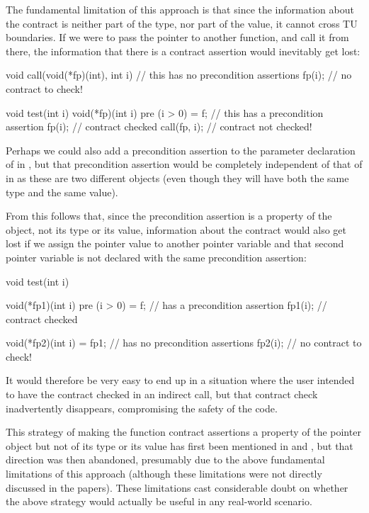 The fundamental limitation of this approach is that since the information about the contract is neither part of the type, nor part of the value, it cannot cross TU boundaries. If we were to pass the pointer  to another function, and call it from there, the information that there is a contract assertion would inevitably get lost:
\begin{codeblock}
void call(void(*fp)(int), int i) {    // this  has no precondition assertions
  fp(i);       // no contract to check!
}

void test(int i) {
  void(*fp)(int i) pre (i > 0) = f;   // this  has a precondition assertion
  fp(i);       // contract  checked
  call(fp, i); // contract  not checked!
}
\end{codeblock}
Perhaps we could also add a precondition assertion to the parameter declaration of  in , but that precondition assertion would be completely independent of that of  in  as these are two different objects (even though they will have both the same type and the same value).

From this follows that, since the precondition assertion is a property of the object, not its type or its value, information about the contract would also get lost if we assign the pointer value to another pointer variable and that second pointer variable is not declared with the same precondition assertion:
\begin{codeblock}
void test(int i) {
  void(*fp1)(int i) pre (i > 0) = f;   //  has a precondition assertion
  fp1(i);   // contract  checked
  
  void(*fp2)(int i) = fp1;             //  has no precondition assertions
  fp2(i);  // no contract to check!
}
\end{codeblock}
It would therefore be very easy to end up in a situation where the user intended to have the contract checked in an indirect call, but that contract check inadvertently disappears, compromising the safety of the code.

This strategy of making the function contract assertions a property of the pointer object but not of its type or its value has first been mentioned in \cite{P0246R0} and \cite{P0247R0}, but that direction was then abandoned, presumably due to the above fundamental limitations of this approach (although these limitations were not directly discussed in the papers). These limitations cast considerable doubt on whether the above strategy would actually be useful in any real-world scenario.

